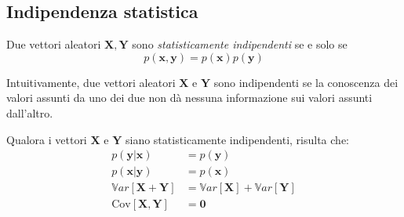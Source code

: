 \subsection{Indipendenza statistica}


\begin{Mybox}
    \begin{definizione}
       Due vettori aleatori $\mathbf{X},\mathbf{Y}$ sono \emph{statisticamente indipendenti} se e solo se
    \begin{equation}
        p(\mathbf{x},\mathbf{y})=p(\mathbf{x})p(\mathbf{y})\label{eq:indipendenza}
    \end{equation}
    \end{definizione}
\end{Mybox}


\noindent Intuitivamente, due vettori aleatori $\mathbf{X}$ e $\mathbf{Y}$ sono indipendenti se la 
conoscenza dei valori assunti da uno dei due non dà nessuna informazione sui valori assunti dall'altro. 



Qualora i vettori $\mathbf{X}$ e $\mathbf{Y}$ siano statisticamente indipendenti, risulta che:
\begin{align}
    p(\mathbf{y}| \mathbf{x}) & = p(\mathbf{y}) \\
    p(\mathbf{x}| \mathbf{y}) & = p(\mathbf{x}) \\
    \mathbb{V}ar[\mathbf{X}+\mathbf{Y}] & = \mathbb{V}ar[\mathbf{X}]+\mathbb{V}ar[\mathbf{Y}] \\
    \text{Cov}[\mathbf{X},\mathbf{Y}]   & = \bm{0}
\end{align}

